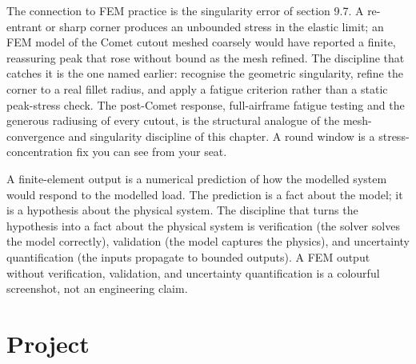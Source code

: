The connection to FEM practice is the singularity error of section
9.7. A re-entrant or sharp corner produces an unbounded stress in the
elastic limit; an FEM model of the Comet cutout meshed coarsely would
have reported a finite, reassuring peak that rose without bound as the
mesh refined. The discipline that catches it is the one named earlier:
recognise the geometric singularity, refine the corner to a real
fillet radius, and apply a fatigue criterion rather than a static
peak-stress check. The post-Comet response, full-airframe fatigue
testing and the generous radiusing of every cutout, is the structural
analogue of the mesh-convergence and singularity discipline of this
chapter. A round window is a stress-concentration fix you can see from
your seat.

\begin{principle}
A finite-element output is a numerical prediction of how the
modelled system would respond to the modelled load. The
prediction is a fact about the model; it is a hypothesis about
the physical system. The discipline that turns the hypothesis
into a fact about the physical system is verification (the
solver solves the model correctly), validation (the model
captures the physics), and uncertainty quantification (the
inputs propagate to bounded outputs). A FEM output without
verification, validation, and uncertainty quantification is a
colourful screenshot, not an engineering claim.
\end{principle}

\section{Project}

